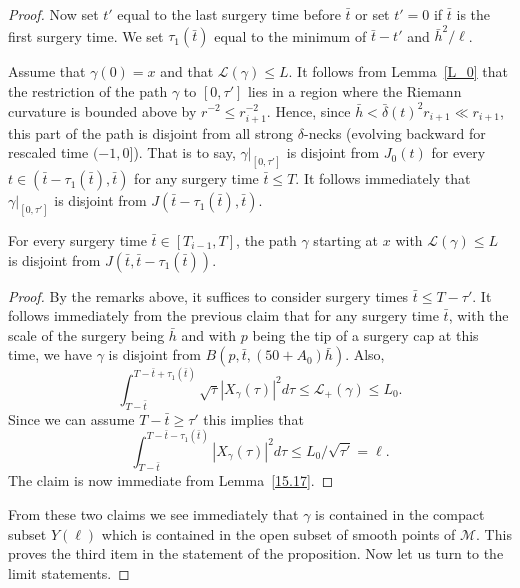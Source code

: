 \begin{proof}
Now set $t'$ equal to the last surgery time before $\bar t$ or set $t'=0$ if $\bar t$ is
the first surgery time. We set $\tau_1(\bar t)$ equal to the minimum of $\bar t-t'$ and
$\bar h^2/\ell$.

Assume that $\gamma(0)=x$ and that ${\mathcal L}(\gamma)\le L$. It follows from
Lemma~\ref{L_0} that the restriction of the path $\gamma$ to $[0,\tau']$ lies
in a region where the Riemann curvature is bounded above by $r^{-2}\le
r_{i+1}^{-2}$. Hence, since $\bar h<\bar\delta(t)^2r_{i+1}\ll r_{i+1}$, this
part of the path  is disjoint from all strong $\delta$-necks (evolving
backward for rescaled time $(-1,0]$). That is to say, $\gamma|_{[0,\tau']}$ is
disjoint from $J_0(t)$ for every $t\in (\bar t-\tau_1(\bar t),\bar t)$ for any
surgery time $\bar t\le T$. It follows immediately that $\gamma|_{[0,\tau']}$
is disjoint from $J(\bar t-\tau_1(\bar t),\bar t)$.

\begin{claim}
\label{claim:path-disjoint-from-J-near-surgery}
For every surgery time $\bar t\in [T_{i-1},T]$, the path $\gamma$
starting at $x$ with ${\mathcal L}(\gamma)\le L$ is disjoint from
$J(\bar t,\bar t-\tau_1(\bar t))$.
\end{claim}

\begin{proof}
By the remarks above, it suffices to consider surgery times $\bar
t\le T-\tau'$. It follows immediately from the previous claim that
for any surgery time $\bar t$, with the scale of the surgery being
$\bar h$ and with $p$ being the tip of a surgery cap at this time,
we have $\gamma$ is disjoint from $B(p,\bar t,(50+A_0)\bar h)$.
Also,
$$\int_{T-\bar t}^{T-\bar t+\tau_1(\bar t)}\sqrt{\tau}|X_\gamma(\tau)|^2d\tau
\le {\mathcal L}_+(\gamma)\le L_0.$$
Since we can assume $T-\bar t\ge \tau'$ this implies that
$$\int_{T-\bar t}^{T-\bar t-\tau_1(\bar t)}|X_\gamma(\tau)|^2d\tau\le L_0/\sqrt{\tau'}=\ell.$$
The claim is now immediate from Lemma~\ref{15.17}.
\end{proof}

From these two claims we see immediately that $\gamma$ is contained in the
compact subset $Y(\ell)$ which is contained in the open subset of smooth points
of ${\mathcal M}$. This proves the third item in the statement of the
proposition. Now let us turn to the limit statements.


\end{proof}
